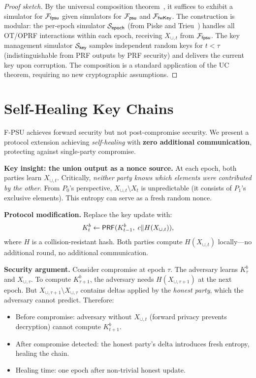 \documentclass[letterpaper,twocolumn,10pt]{article}
\theoremstyle{definition}
\newcommand{\PRF}{\mathsf{PRF}}\newcommand{\ChaCha}{\mathsf{ChaCha20}}
\begin{document}
\begin{proof}[Proof sketch]
By the universal composition theorem~\cite{Can01}, it suffices to exhibit a
simulator for $\mathcal{F}_{\mathsf{fpsu}}$ given simulators for $\mathcal{F}_{\mathsf{psu}}$
and $\mathcal{F}_{\mathsf{fwKey}}$. The construction is modular: the per-epoch
simulator $\mathcal{S}_{\mathsf{epoch}}$ (from Piske and Trieu~\cite{PT26}) handles
all OT/OPRF interactions within each epoch, receiving $X_{\cup,t}$ from
$\mathcal{F}_{\mathsf{fpsu}}$. The key management simulator $\mathcal{S}_{\mathsf{key}}$
samples independent random keys for $t < \tau$ (indistinguishable from PRF
outputs by PRF security) and delivers the current key upon corruption. The
composition is a standard application of the UC theorem, requiring no new
cryptographic assumptions.
\end{proof}

\section{Self-Healing Key Chains}
\label{sec:selfheal}

F-PSU achieves forward security but not post-compromise security. We present
a protocol extension achieving \emph{self-healing} with \textbf{zero additional
communication}, protecting against single-party compromise.

\textbf{Key insight: the union output as a nonce source.}
At each epoch, both parties learn $X_{\cup,t}$. Critically, \emph{neither
party knows which elements were contributed by the other}. From $P_0$'s
perspective, $X_{\cup,t} \setminus X_t$ is unpredictable (it consists of
$P_1$'s exclusive elements). This entropy can serve as a fresh random nonce.

\textbf{Protocol modification.}
Replace the key update with:
\[
K^b_t \leftarrow \PRF(K^b_{t-1},\; c \concat H(X_{\cup,t})),
\]
where $H$ is a collision-resistant hash. Both parties compute $H(X_{\cup,t})$
locally---no additional round, no additional communication.

\textbf{Security argument.}
Consider compromise at epoch $\tau$. The adversary learns $K^b_\tau$ and
$X_{\cup,\tau}$. To compute $K^b_{\tau+1}$, the adversary needs
$H(X_{\cup,\tau+1})$ at the next epoch. But $X_{\cup,\tau+1} \setminus
X_{\cup,\tau}$ contains deltas applied by the \emph{honest party}, which the
adversary cannot predict. Therefore:
\begin{itemize}
\item Before compromise: adversary without $X_{\cup,t}$ (forward privacy
prevents decryption) cannot compute $K^b_{t+1}$.
\item After compromise detected: the honest party's delta introduces fresh
entropy, healing the chain.
\item Healing time: one epoch after non-trivial honest update.
\end{itemize}
\end{document}
